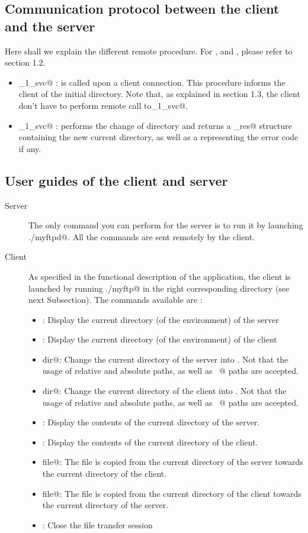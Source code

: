 \documentclass{article}
\begin{document}
\subsection{Communication protocol between the client and the server}
Here shall we explain the different remote procedure. For \verb@get@, \verb@ls@ and \verb@put@, please refer to section 1.2.
\begin{itemize}
\item \verb@rpwd_1_svc@ : is called upon a client connection. This procedure informs the client of the initial directory. Note that, as explained in section 1.3, the client don't have to perform remote call to\verb@rpwd_1_svc@.
\item \verb@rcd_1_svc@ : performs the change of directory and returns a \verb@cd_res@ structure containing the new current directory, as well as a \verb@int@ representing the error code if any.
\end{itemize}
\subsection{User guides of the client and server}
\begin{description}
\item[Server] The only command you can perform for the server is to run it by launching \verb@./myftpd@. All the commands are sent remotely by the client.
\item[Client] As specified in the functional description of the application, the client is launched by running \verb@./myftp@ in the right corresponding directory (see next Subsection). The commands available are :
\begin{itemize}
\item \verb@pwd@: Display the current directory (of the environment) of the server
\item \verb@lpwd@: Display the current directory (of the environment) of the client
\item \verb@cd dir@: Change the current directory of the server into \verb@dir@. Not that the usage of relative and absolute paths, as well as \verb@~@ paths  are accepted.
\item \verb@lcd dir@: Change the current directory of the client into \verb@dir@. Not that the usage of relative and absolute paths, as well as \verb@~@ paths  are accepted.
\item \verb@ls@: Display the contents of the current directory of the server.
\item \verb@lls@: Display the contents of the current directory of the client.
\item \verb@get file@: The file \verb@file@ is copied from the current directory of the server towards the current directory of the client.
\item \verb@put file@: The file \verb@file@ is copied from the current directory of the client towards the current directory of the server.
\item \verb@bye@: Close the file transfer session
\end{itemize}
\end{description}
\end{document}
